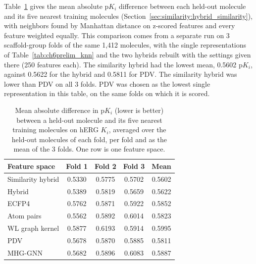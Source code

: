 Table~\ref{tab:ch6prelim_neighbor_gap} gives the mean absolute p$K_i$ difference between each held-out molecule and its five nearest training molecules (Section~\ref{sec:similarity:hybrid_similarity}), with neighbors found by Manhattan distance on z-scored features and every feature weighted equally. This comparison comes from a separate run on 3 scaffold-group folds of the same 1,412 molecules, with the single representations of Table~\ref{tab:ch6prelim_knn} and the two hybrids rebuilt with the settings given there (250 features each). The similarity hybrid had the lowest mean, 0.5602 p$K_i$, against 0.5622 for the hybrid and 0.5811 for PDV. The similarity hybrid was lower than PDV on all 3 folds. PDV was chosen as the lowest single representation in this table, on the same folds on which it is scored.

\begin{table}[htbp]
\centering
\small
\begin{tabular}{@{}lcccc@{}}
\toprule
Feature space & Fold 1 & Fold 2 & Fold 3 & Mean \\
\midrule
Similarity hybrid & 0.5330 & 0.5775 & 0.5702 & 0.5602 \\
Hybrid & 0.5389 & 0.5819 & 0.5659 & 0.5622 \\
ECFP4 & 0.5762 & 0.5871 & 0.5922 & 0.5852 \\
Atom pairs & 0.5562 & 0.5892 & 0.6014 & 0.5823 \\
WL graph kernel & 0.5877 & 0.6193 & 0.5914 & 0.5995 \\
PDV & 0.5678 & 0.5870 & 0.5885 & 0.5811 \\
MHG-GNN & 0.5682 & 0.5896 & 0.6083 & 0.5887 \\
\bottomrule
\end{tabular}
\caption[Activity difference to the nearest neighbors on hERG $K_i$]{Mean absolute difference in p$K_i$ (lower is better) between a held-out molecule and its five nearest training molecules on hERG $K_i$, averaged over the held-out molecules of each fold, per fold and as the mean of the 3 folds. One row is one feature space.}
\label{tab:ch6prelim_neighbor_gap}
\end{table}

